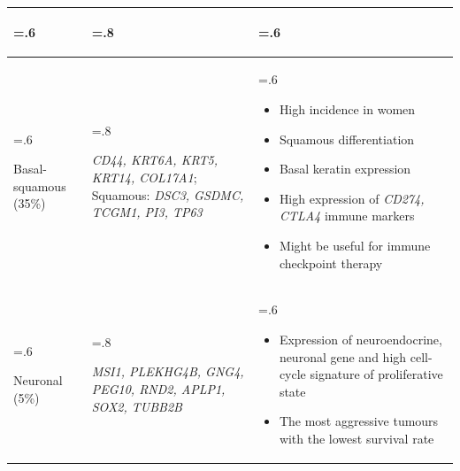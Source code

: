 \begin{table}[htbp]
\begin{tabularx}{\textwidth}{
      >{\hsize=.6\hsize\raggedright\arraybackslash}X
      >{\hsize=.8\hsize\raggedright\arraybackslash}X
      >{\hsize=.6\hsize\arraybackslash}X
    }
\begin{itemize}[leftmargin=*, nosep, after=\vspace{-\baselineskip}, before=\vspace{-.6\baselineskip}]
    \end{itemize} \\
    \midrule
    Basal-squamous (35\%) &\textit{ CD44, KRT6A, KRT5, KRT14, COL17A1}; Squamous: \textit{DSC3, GSDMC, TCGM1, PI3, TP63} & 
    \begin{itemize}[leftmargin=*, nosep, after=\vspace{-\baselineskip}, before=\vspace{-.6\baselineskip}]
        \item High incidence in women
        \item Squamous differentiation
        \item Basal keratin expression
        \item High expression of \textit{CD274, CTLA4} immune markers
        \item Might be useful for immune checkpoint therapy
    \end{itemize} \\
    \midrule
    Neuronal (5\%) &\textit{ MSI1, PLEKHG4B, GNG4, PEG10, RND2, APLP1, SOX2, TUBB2B} & 
    \begin{itemize}[leftmargin=*, nosep, after=\vspace{-\baselineskip}, before=\vspace{-.6\baselineskip}]
        \item Expression of neuroendocrine, neuronal gene and high cell-cycle signature of proliferative state
        \item The most aggressive tumours with the lowest survival rate
    \end{itemize} \\
    \bottomrule
    \end{tabularx}
    \label{tab:lit:tcga_genes}
\end{table}

